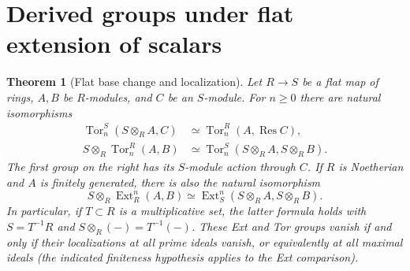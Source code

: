 \documentclass[11pt,oneside,openany]{book}
\newtheorem{theorem}{Theorem}[chapter]
\theoremstyle{definition}
\theoremstyle{remark}
\begin{document}
\section{Derived groups under flat extension of scalars}

\begin{theorem}[Flat base change and localization]
\label{p103:ALG-10-C03-S03}
Let \(R\to S\) be a flat map of rings, \(A,B\) be \(R\)-modules,
and \(C\) be an \(S\)-module. For \(n\ge0\) there are natural
isomorphisms
\[
 \begin{aligned}
 \operatorname{Tor}_n^S(S\otimes_R A,C)
  &\simeq \operatorname{Tor}_n^R(A,\operatorname{Res} C),\\
 S\otimes_R\operatorname{Tor}_n^R(A,B)
  &\simeq \operatorname{Tor}_n^S(S\otimes_R A,S\otimes_R B).
 \end{aligned}
\]
The first group on the right has its \(S\)-module action through \(C\).
If \(R\) is Noetherian and \(A\) is finitely generated, there is
also the natural isomorphism
\[
 S\otimes_R\operatorname{Ext}_R^n(A,B)
 \simeq \operatorname{Ext}_S^n(S\otimes_R A,S\otimes_R B).
\]
In particular, if \(T\subset R\) is a multiplicative set, the
latter formula holds with \(S=T^{-1}R\) and
\(S\otimes_R(-)=T^{-1}(-)\).
These Ext and Tor groups vanish if and only if their localizations
at all prime ideals vanish, or equivalently at all maximal ideals
(the indicated finiteness hypothesis applies to the Ext comparison).
\end{theorem}
\end{document}
